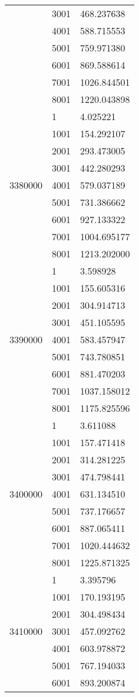 \begin{table}[htb!]
\begin{tabular}{lll}
 & 3001 & 468.237638 \\
 & 4001 & 588.715553 \\
 & 5001 & 759.971380 \\
 & 6001 & 869.588614 \\
 & 7001 & 1026.844501 \\
 & 8001 & 1220.043898 \\
\multirow[c]{9}{*}{3380000} & 1 & 4.025221 \\
 & 1001 & 154.292107 \\
 & 2001 & 293.473005 \\
 & 3001 & 442.280293 \\
 & 4001 & 579.037189 \\
 & 5001 & 731.386662 \\
 & 6001 & 927.133322 \\
 & 7001 & 1004.695177 \\
 & 8001 & 1213.202000 \\
\multirow[c]{9}{*}{3390000} & 1 & 3.598928 \\
 & 1001 & 155.605316 \\
 & 2001 & 304.914713 \\
 & 3001 & 451.105595 \\
 & 4001 & 583.457947 \\
 & 5001 & 743.780851 \\
 & 6001 & 881.470203 \\
 & 7001 & 1037.158012 \\
 & 8001 & 1175.825596 \\
\multirow[c]{9}{*}{3400000} & 1 & 3.611088 \\
 & 1001 & 157.471418 \\
 & 2001 & 314.281225 \\
 & 3001 & 474.798441 \\
 & 4001 & 631.134510 \\
 & 5001 & 737.176657 \\
 & 6001 & 887.065411 \\
 & 7001 & 1020.444632 \\
 & 8001 & 1225.871325 \\
\multirow[c]{9}{*}{3410000} & 1 & 3.395796 \\
 & 1001 & 170.193195 \\
 & 2001 & 304.498434 \\
 & 3001 & 457.092762 \\
 & 4001 & 603.978872 \\
 & 5001 & 767.194033 \\
 & 6001 & 893.200874 \\

\end{tabular}
\end{table}
